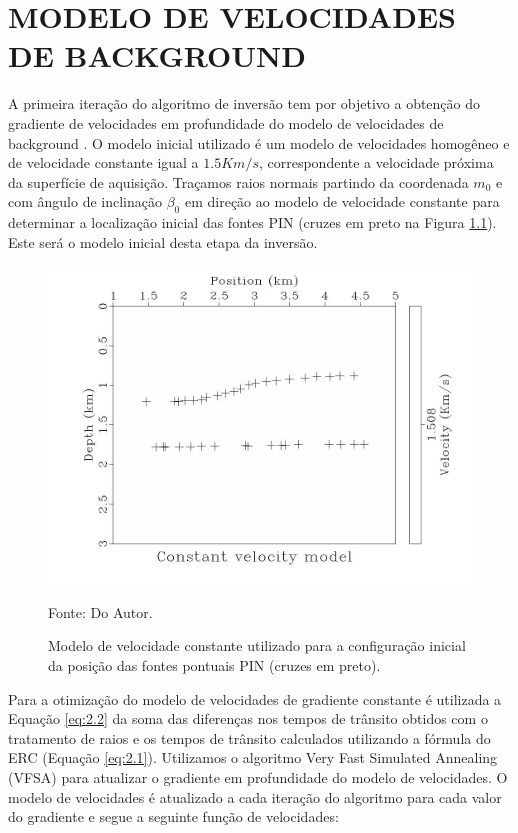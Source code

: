 \chapter{MODELO DE VELOCIDADES DE BACKGROUND}
\label{cap3}

A primeira iteração do algoritmo de inversão tem por objetivo a obtenção do gradiente de
velocidades em profundidade do modelo de velocidades de background \cite{niptomo,stereo}.
O modelo inicial utilizado é um modelo de velocidades homogêneo
e de velocidade constante igual a $1.5Km/s$,
correspondente a velocidade próxima da superfície de aquisição. Traçamos raios normais
partindo da coordenada $m_0$ e com ângulo de inclinação $\beta_0$ em direção ao modelo
de velocidade constante para determinar a localização inicial das fontes PIN (cruzes
em preto na Figura \ref{fig:3.1}). Este será o modelo inicial desta etapa da inversão.

\begin{figure}[H]
\caption{Modelo de velocidade constante utilizado para a configuração inicial da
posição das fontes pontuais PIN (cruzes em preto).}
\begin{center}
\includegraphics[scale=0.3]{images/ctevel.jpeg}
\vspace{-0.3cm}
\end{center}
\begin{center}
 Fonte: Do Autor.
\end{center}
\label{fig:3.1}
\end{figure}


Para a otimização do modelo de velocidades de gradiente constante
é utilizada a Equação \ref{eq:2.2} da soma das
diferenças nos tempos de trânsito obtidos com o tratamento de raios e os tempos de trânsito calculados utilizando a fórmula do ERC (Equação \ref{eq:2.1}). Utilizamos o algoritmo Very Fast Simulated Annealing (VFSA) para atualizar o gradiente em profundidade do modelo de velocidades.
O modelo de velocidades é atualizado a cada iteração do algoritmo para cada valor do gradiente e segue a seguinte função de velocidades:

